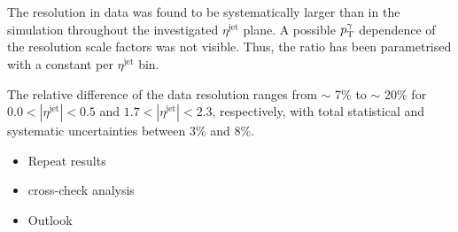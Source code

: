 The resolution in data was found to be systematically larger than in the simulation throughout the investigated $\eta^{\text{jet}}$ plane. 
A possible $p_{\text{T}}^{\gamma}$ dependence of the resolution scale factors was not visible. 
Thus, the ratio has been parametrised with a constant per $\eta^{\text{jet}}$ bin.

The relative difference of the data resolution ranges from $\sim$ 7\% to $\sim$ 20\% for  $0.0<|\eta^{\text{jet}}|<0.5$ and  $1.7<|\eta^{\text{jet}}|<2.3$, respectively, 
with total statistical and systematic uncertainties between 3\% and 8\%.



\begin{itemize}
\item Repeat results
\item cross-check analysis
\item Outlook
\end{itemize}

